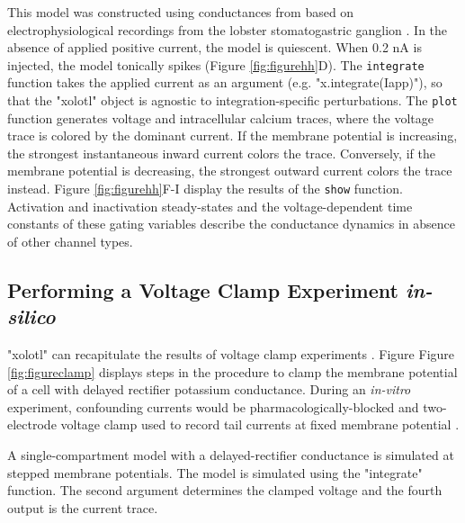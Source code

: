 \documentclass{frontiersSCNS} %
\begin{document}
This model was constructed using conductances from \cite{liuModelNeuronActivitydependent1998} based on electrophysiological recordings from the lobster stomatogastric ganglion \autocite{turrigianoSelectiveRegulationCurrent1995}. In the absence of applied positive current, the model is quiescent. When 0.2 nA is injected, the model tonically spikes (Figure \ref{fig:figurehh}D). The \texttt{integrate} function takes the applied current as an argument (e.g. "x.integrate(Iapp)"), so that the "xolotl" object is agnostic to integration-specific perturbations. The \texttt{plot} function generates voltage and intracellular calcium traces, where the voltage trace is colored by the dominant current. If the membrane potential is increasing, the strongest instantaneous inward current colors the trace. Conversely, if the membrane potential is decreasing, the strongest outward current colors the trace instead. Figure \ref{fig:figurehh}F-I display the results of the \texttt{show} function. Activation and inactivation steady-states and the voltage-dependent time constants of these gating variables describe the conductance dynamics in absence of other channel types.

%
%
%
%
%
%

\subsection{Performing a Voltage Clamp Experiment \textit{in-silico}}

"xolotl" can recapitulate the results of voltage clamp experiments \autocite{turrigianoSelectiveRegulationCurrent1995, swensenMultiplePeptidesConverge2000, swensenModulatorsConvergentCellular2001, destexheDynamicClampPrinciplesApplications2009}. Figure Figure \ref{fig:figureclamp} displays steps in the procedure to clamp the membrane potential of a cell with delayed rectifier potassium conductance. During an \textit{in-vitro} experiment, confounding currents would be pharmacologically-blocked and two-electrode voltage clamp used to record tail currents at fixed membrane potential \autocite{connorInwardDelayedOutward1971, connorVoltageClampStudies1971}.

A single-compartment model with a delayed-rectifier conductance is simulated at stepped membrane potentials. The model is simulated using the "integrate" function. The second argument determines the clamped voltage and the fourth output is the current trace.
\end{document}

